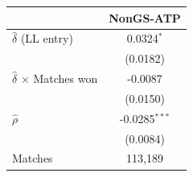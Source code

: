 \begin{tabular}{lc}
\toprule
 & NonGS-ATP \\
\midrule
$\hat{\delta}$ (LL entry) & 0.0324$^{*}$ \\
 & (0.0182) \\
$\hat{\delta}$ $\times$ Matches won & -0.0087 \\
 & (0.0150) \\
$\hat{\rho}$ & -0.0285$^{***}$ \\
 & (0.0084) \\
\midrule
Matches & 113,189 \\
\bottomrule
\end{tabular}
